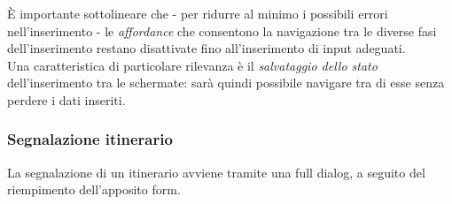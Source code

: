 \documentclass{natourDoc}
\begin{document}
È importante sottolineare che - per ridurre al minimo i possibili errori nell'inserimento - le \textit{affordance}
che consentono la navigazione tra le diverse fasi dell'inserimento restano disattivate fino all'inserimento di input adeguati.\\

Una caratteristica di particolare rilevanza è il \textit{salvataggio dello stato} dell'inserimento tra le schermate: sarà quindi
possibile navigare tra di esse senza perdere i dati inseriti. \\

\newpage
\subsubsection{Segnalazione itinerario}
La segnalazione di un itinerario avviene tramite una full dialog, a seguito del riempimento dell'apposito form.
\end{document}
